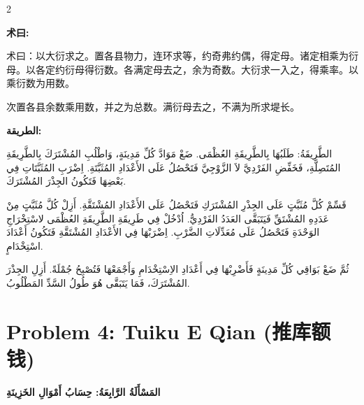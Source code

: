 \documentclass[11pt,a4paper]{article}
\newcommand{\ar}[1]{\arabicfont\beginR #1\endR}
\newcommand{\zhtext}[1]{{\chinese #1}}
\newenvironment{bilingual}{%
  \begin{paracol}{2}
}{%
  \end{paracol}
}
\newcommand{\cnlabel}[1]{\textcolor{algocolor}{\textbf{#1}}}
\newcommand{\arlabel}[1]{\ar{\textcolor{algocolor}{\textbf{#1}}}}
\begin{document}
\vspace{1em}

\begin{bilingual}

\begin{leftcolumn*}
\cnlabel{术曰:}

术曰：以大衍求之。置各县物力，连环求等，约奇弗约偶，得定母。诸定相乘为衍母。以各定约衍母得衍数。各满定母去之，余为奇数。大衍求一入之，得乘率。以乘衍数为用数。

次置各县余数乘用数，并之为总数。满衍母去之，不满为所求堤长。
\end{leftcolumn*}

\begin{rightcolumn*}
\arlabel{الطريقة:}

\ar{الطَّرِيقَةُ: طَلَبُهَا بِالطَّرِيقَةِ العُظْمَى. ضَعْ مَوَادَّ كُلِّ مَدِينَةٍ، وَاطْلُبِ المُشْتَرَكَ بِالطَّرِيقَةِ المُتَصِلَّةِ، فَخَفِّضِ الفَرْدِيَّ لاَ الزَّوْجِيَّ فَتَحْصُلُ عَلَى الأَعْدَادِ المُثَبَّتَةِ. اِضْرَبِ المُثَبَّتَاتِ فِي بَعْضِهَا فَتَكُونُ الجِذْرَ المُشْتَرَكَ.}

\ar{قَسِّمْ كُلَّ مُثَبَّتٍ عَلَى الجِذْرِ المُشْتَرَكِ فَتَحْصُلُ عَلَى الأَعْدَادِ المُشْتَقَّةِ. أَزِلْ كُلَّ مُثَبَّتٍ مِنْ عَدَدِهِ المُشْتَقِّ فَيَتَبَقَّى العَدَدُ الفَرْدِيُّ. اُدْخُلْ فِي طَرِيقَةِ الطَّرِيقَةِ العُظْمَى لاسْتِخْرَاجِ الوَحْدَةِ فَتَحْصُلُ عَلَى مُعَدِّلَاتِ الضَّرْبِ. اِضْرَبْهَا فِي الأَعْدَادِ المُشْتَقَّةِ فَتَكُونُ أَعْدَادَ اسْتِخْدَامٍ.}

\ar{ثُمَّ ضَعْ بَوَاقِي كُلِّ مَدِينَةٍ فَأَضْرِبْهَا فِي أَعْدَادِ الاِسْتِخْدَامِ وَأَجْمَعْهَا فَتُصْبِحُ جُمْلَةً. أَزِلِ الجِذْرَ المُشْتَرَكَ، فَمَا يَتَبَقَّى هُوَ طُولُ السَّدِّ المَطْلُوبُ.}
\end{rightcolumn*}

\end{bilingual}

\newpage

\section{Problem 4: Tuiku E Qian (\zhtext{推库额钱})}
\ar{\textbf{المَسْأَلَةُ الرَّابِعَةُ: حِسَابُ أَمْوَالِ الخَزِينَةِ}}
\end{document}
